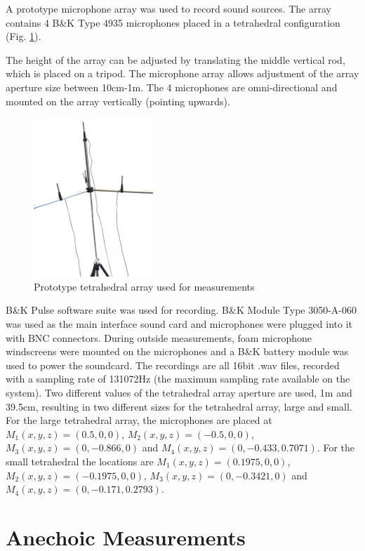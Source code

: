 A prototype microphone array was used to record sound sources. The array contains 4 B\&K Type 4935 microphones placed in a tetrahedral configuration (Fig. \ref{fig:arraymic1}). 

The height of the array can be adjusted by translating the middle vertical rod, which is placed on a tripod. The microphone array allows adjustment of the array aperture size between 10cm-1m. The 4 microphones are omni-directional and mounted on the array vertically (pointing upwards). 
\begin{figure}
    \centering
    \includegraphics[width=0.4\textwidth]{Figures/Arraymicrophone.png}
    \caption{\label{fig:arraymic1}Prototype tetrahedral array used for measurements}
\end{figure}
B\&K Pulse software suite was used for recording. B\&K Module Type 3050-A-060 was used as the main interface sound card and microphones were plugged into it with BNC connectors. During outside measurements, foam microphone windscreens were mounted on the microphones and a B\&K battery module was used to power the soundcard. The recordings are all 16bit .wav files, recorded with a sampling rate of 131072Hz (the maximum sampling rate available on the system). Two different values of the tetrahedral array aperture are used, 1m and 39.5cm, resulting in two different sizes for the tetrahedral array, large and small. For the large tetrahedral array, the microphones are placed at $M_1(x,y,z)=(0.5, 0, 0)$, $M_2(x,y,z)=(-0.5, 0, 0)$, $M_3(x,y,z)=(0, -0.866, 0)$ and $M_4(x,y,z)=(0, -0.433, 0.7071)$. For the small tetrahedral the locations are  $M_1(x,y,z)=(0.1975, 0, 0)$, $M_2(x,y,z)=(-0.1975, 0, 0)$, $M_3(x,y,z)=(0, -0.3421, 0)$ and $M_4(x,y,z)=(0, -0.171, 0.2793)$.


\section{Anechoic Measurements}
